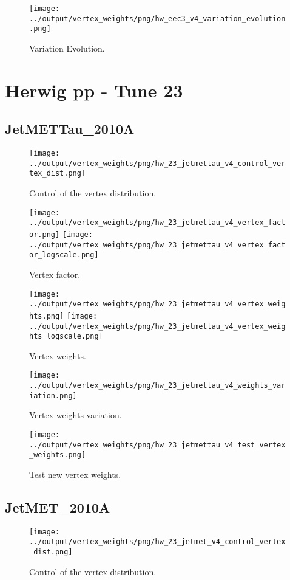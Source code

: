 \documentclass[11pt]{book}
\begin{document}
\begin{figure}[ht]
\centering
\texttt{[image: ../output/vertex\_weights/png/hw\_eec3\_v4\_variation\_evolution.png]}
\caption{Variation Evolution.}
\end{figure}
\clearpage



\section{Herwig pp - Tune 23}
\subsection{JetMETTau\_2010A}
\begin{figure}[ht]
\centering
\texttt{[image: ../output/vertex\_weights/png/hw\_23\_jetmettau\_v4\_control\_vertex\_dist.png]}
\caption{Control of the vertex distribution.}
\end{figure}

\begin{figure}[ht]
\centering
\texttt{[image: ../output/vertex\_weights/png/hw\_23\_jetmettau\_v4\_vertex\_factor.png]}
\texttt{[image: ../output/vertex\_weights/png/hw\_23\_jetmettau\_v4\_vertex\_factor\_logscale.png]}
\caption{Vertex factor.}
\end{figure}

\begin{figure}[ht]
\centering
\texttt{[image: ../output/vertex\_weights/png/hw\_23\_jetmettau\_v4\_vertex\_weights.png]}
\texttt{[image: ../output/vertex\_weights/png/hw\_23\_jetmettau\_v4\_vertex\_weights\_logscale.png]}
\caption{Vertex weights.}
\end{figure}

\begin{figure}[ht]
\centering
\texttt{[image: ../output/vertex\_weights/png/hw\_23\_jetmettau\_v4\_weights\_variation.png]}
\caption{Vertex weights variation.}
\end{figure}

\begin{figure}[ht]
\centering
\texttt{[image: ../output/vertex\_weights/png/hw\_23\_jetmettau\_v4\_test\_vertex\_weights.png]}
\caption{Test new vertex weights.}
\end{figure}
\clearpage

\subsection{JetMET\_2010A}
\begin{figure}[ht]
\centering
\texttt{[image: ../output/vertex\_weights/png/hw\_23\_jetmet\_v4\_control\_vertex\_dist.png]}
\caption{Control of the vertex distribution.}
\end{figure}
\end{document}
